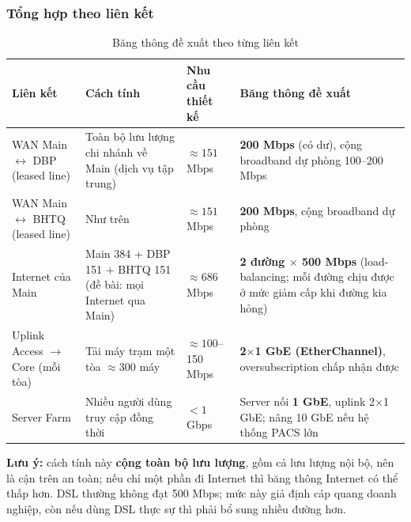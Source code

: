 \subsubsection{Tổng hợp theo liên kết}
\begin{small}
\setlength{\tabcolsep}{4pt}
\begin{longtable}{|p{2.8cm}|p{4.2cm}|p{2.0cm}|p{4.6cm}|}
\caption{Băng thông đề xuất theo từng liên kết} \label{tab:bw_links} \\
\hline
\textbf{Liên kết} & \textbf{Cách tính} & \textbf{Nhu cầu thiết kế} & \textbf{Băng thông đề xuất} \\ \hline
\endhead
WAN Main $\leftrightarrow$ DBP (leased line) & Toàn bộ lưu lượng chi nhánh về Main (dịch vụ tập trung) & $\approx 151$ Mbps & \textbf{200 Mbps} (có dư), cộng broadband dự phòng 100--200 Mbps \\ \hline
WAN Main $\leftrightarrow$ BHTQ (leased line) & Như trên & $\approx 151$ Mbps & \textbf{200 Mbps}, cộng broadband dự phòng \\ \hline
Internet của Main & Main 384 + DBP 151 + BHTQ 151 (đề bài: mọi Internet qua Main) & $\approx 686$ Mbps & \textbf{2 đường $\times$ 500 Mbps} (load-balancing; mỗi đường chịu được ở mức giảm cấp khi đường kia hỏng) \\ \hline
Uplink Access $\to$ Core (mỗi tòa) & Tải máy trạm một tòa $\approx 300$ máy & $\approx 100$--150 Mbps & \textbf{2$\times$1 GbE (EtherChannel)}, oversubscription chấp nhận được \\ \hline
Server Farm & Nhiều người dùng truy cập đồng thời & $< 1$ Gbps & Server nối \textbf{1 GbE}, uplink 2$\times$1 GbE; nâng 10 GbE nếu hệ thống PACS lớn \\ \hline
\end{longtable}
\end{small}
\noindent \textbf{Lưu ý:} cách tính này \textbf{cộng toàn bộ lưu lượng}, gồm cả lưu lượng nội bộ, nên là cận trên an toàn; nếu chỉ một phần đi Internet thì băng thông Internet có thể thấp hơn. DSL thường không đạt 500 Mbps; mức này giả định cáp quang doanh nghiệp, còn nếu dùng DSL thực sự thì phải bổ sung nhiều đường hơn.

